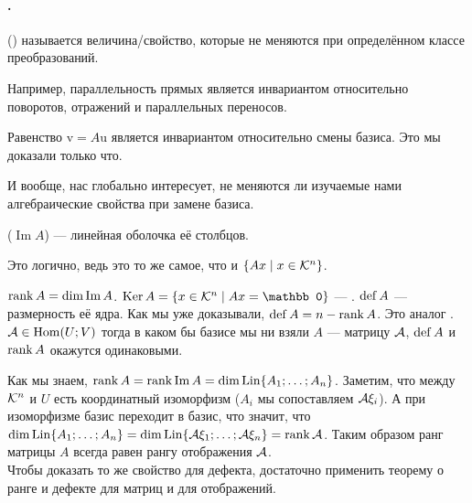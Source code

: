 \documentclass{article}
\DeclareMathOperator{\operIm}{Im}
\let\Im\operIm
\begin{document}
    \paragraph{.}
    \begin{itemize}
        \dfn {} () называется величина/свойство, которые не меняются при определённом классе преобразований.
        \begin{Example}
            Например, параллельность прямых является инвариантом относительно поворотов, отражений и параллельных переносов.
        \end{Example}
        \begin{Example}
            Равенство $\mathrm v=A\mathrm u$ является инвариантом относительно смены базиса. Это мы доказали только что.
        \end{Example}
        \begin{Comment}
            И вообще, нас глобально интересует, не меняются ли изучаемые нами алгебраические свойства при замене базиса.
        \end{Comment}
        \dfn {} ($\Im A$) --- линейная оболочка её столбцов.
        \begin{Comment}
            Это логично, ведь это то же самое, что и $\{Ax\mid x\in{\mathcal{K}}^n\}$.
        \end{Comment}
        \thm $\rank A=\dim\Im A$.
        \dfn $\Ker A=\{x\in\scriptK^n\mid Ax=\mathbb0\}$ --- .
        \dfn {} $\operatorname{def} A$ --- размерность её ядра.
        \thm Как мы уже доказывали, $\operatorname{def} A=n-\operatorname{rank} A$. Это аналог .
        \thm ${\mathcal{A}}\in\operatorname{Hom}(U;V)$ тогда в каком бы базисе мы ни взяли $A$ --- матрицу ${\mathcal{A}}$, $\operatorname{def} A$ и $\operatorname{rank} A$ окажутся одинаковыми.
        \begin{Proof}
            Как мы знаем, $\rank A=\rank\Im A=\dim\Lin\{A_1;\ldots;A_n\}$. Заметим, что между ${\mathcal{K}}^n$ и $U$ есть координатный изоморфизм ($A_i$ мы сопоставляем ${\mathcal{A}}\xi_i$). А при изоморфизме базис переходит в базис, что значит, что $\dim\operatorname{Lin}\{A_1;\ldots;A_n\}=\dim\operatorname{Lin}\{{\mathcal{A}}\xi_1;\ldots;{\mathcal{A}}\xi_n\}=\operatorname{rank}{\mathcal{A}}$. Таким образом ранг матрицы $A$ всегда равен рангу отображения ${\mathcal{A}}$.\\
            Чтобы доказать то же свойство для дефекта, достаточно применить теорему о ранге и дефекте для матриц и для отображений.

\end{Proof}
\end{itemize}
\end{document}
